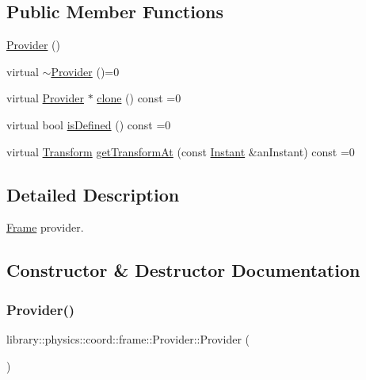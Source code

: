\subsection*{Public Member Functions}
\begin{DoxyCompactItemize}
\item 
\hyperlink{classlibrary_1_1physics_1_1coord_1_1frame_1_1_provider_a51327e656332668ba3726d52d7a27f22}{Provider} ()
\item 
virtual \hyperlink{classlibrary_1_1physics_1_1coord_1_1frame_1_1_provider_a7683aa718a339d1bfc8658dc9509adaf}{$\sim$\+Provider} ()=0
\item 
virtual \hyperlink{classlibrary_1_1physics_1_1coord_1_1frame_1_1_provider}{Provider} $\ast$ \hyperlink{classlibrary_1_1physics_1_1coord_1_1frame_1_1_provider_ab8eee40c8ef4aee0b57bedf458f4934e}{clone} () const =0
\item 
virtual bool \hyperlink{classlibrary_1_1physics_1_1coord_1_1frame_1_1_provider_ae7cd093febf2b20f71400f9f79442774}{is\+Defined} () const =0
\item 
virtual \hyperlink{classlibrary_1_1physics_1_1coord_1_1_transform}{Transform} \hyperlink{classlibrary_1_1physics_1_1coord_1_1frame_1_1_provider_a796fd2dd337f1304a0e9acf573ce2550}{get\+Transform\+At} (const \hyperlink{classlibrary_1_1physics_1_1time_1_1_instant}{Instant} \&an\+Instant) const =0
\end{DoxyCompactItemize}


\subsection{Detailed Description}
\hyperlink{classlibrary_1_1physics_1_1coord_1_1_frame}{Frame} provider. 

\subsection{Constructor \& Destructor Documentation}
\mbox{\label{classlibrary_1_1physics_1_1coord_1_1frame_1_1_provider_a51327e656332668ba3726d52d7a27f22}} 
\subsubsection{\texorpdfstring{Provider()}{Provider()}}
{\footnotesize\ttfamily library\+::physics\+::coord\+::frame\+::\+Provider\+::\+Provider (\begin{DoxyParamCaption}{ }\end{DoxyParamCaption})}


